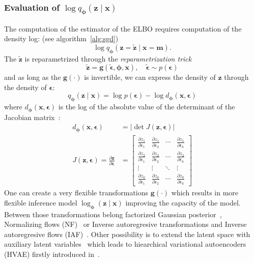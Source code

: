\subsubsection{Evaluation of $\log q_{\boldsymbol{\phi}}(\boldsymbol{z}\mid \boldsymbol{x})$}
\label{subsubsec:log_q}
The computation of the estimator of the ELBO requires computation of the density log: (see algorithm~\ref{alg:sgd})
$$
\log q_{\boldsymbol{\phi}}(\boldsymbol{z}=\tilde{\boldsymbol{z}}\mid \boldsymbol{x}=\boldsymbol{m}).
$$ 
The $\tilde{\boldsymbol{z}}$ is reparametrized through the \textit{reparametrization trick}
$$
\tilde{\boldsymbol{z}} = \mathbf{g}(\tilde{\boldsymbol{\epsilon}},{\boldsymbol{\phi}},\mathbf{x}),\quad \tilde{\boldsymbol{\epsilon}} \sim p(\boldsymbol{\epsilon})
$$
and as long as the $\mathbf{g}(\cdot)$ is invertible, we can express the density of $\boldsymbol{z}$ through the density of $\boldsymbol{\epsilon}$:
$$
q_{\boldsymbol{\phi}}(\mathbf{z}\mid \mathbf{x}) = \log p(\boldsymbol{\epsilon}) - \log d_{\boldsymbol{\phi}}(\boldsymbol{x},\boldsymbol{\epsilon})
$$
where $d_{\boldsymbol{\phi}}(\boldsymbol{x},\boldsymbol{\epsilon})$ is the log of the absolute value of the determinant of the Jacobian 
matrix~\cite{intro-vae-2019}:
\begin{align*}
d_{\boldsymbol{\phi}}(\boldsymbol{x},\boldsymbol{\epsilon}) &= |\det J(\boldsymbol{z}, \boldsymbol{\epsilon})|\\
J(\boldsymbol{z}, \boldsymbol{\epsilon}) = \frac{\partial \boldsymbol{z}}{\partial \boldsymbol{\epsilon}} &=
\begin{bmatrix}
\frac{\partial z_1}{\partial \epsilon_1} & \frac{\partial z_1}{\partial \epsilon_2} & \cdots & \frac{\partial z_1}{\partial \epsilon_k} \\
\frac{\partial z_2}{\partial \epsilon_1} & \frac{\partial z_2}{\partial \epsilon_2} & \cdots & \frac{\partial z_2}{\partial \epsilon_k} \\
\vdots & \vdots & \ddots & \vdots \\
\frac{\partial z_k}{\partial \epsilon_1} & \frac{\partial z_k}{\partial \epsilon_2} & \cdots & \frac{\partial z_k}{\partial \epsilon_k}
\end{bmatrix}
\end{align*}
One can create a very flexible transformations $\boldsymbol{g}(\cdot)$ which results in more flexible inference model 
$\log_{\boldsymbol{\phi}}(\boldsymbol{z}\mid\boldsymbol{x})$ improving the capacity of the model. Between those transformations
belong factorized Gaussian posterior~\cite{intro-vae-2019}, Normalizing flows (NF)~\cite{nf-2015} or Inverse autoregresive transformations and 
Inverse autoregresive flows (IAF)~\cite{iaf-2016}. Other possibility is to extend the latent space with auxiliary latent variables~\cite{aux-var-2016}
which leads to hiearchical variational autoencoders (HVAE) firstly introduced in~\cite{lvae-2016}.

